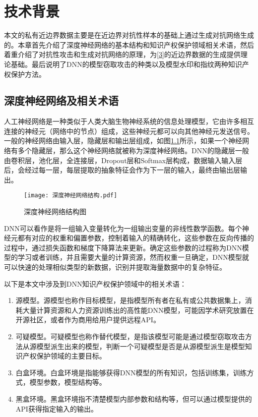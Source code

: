 

\chapter{技术背景} 
\label{2}

本文的私有近边界数据主要是在近边界对抗性样本的基础上通过生成对抗网络生成的。本章首先介绍了深度神经网络的基本结构和知识产权保护领域相关术语，然后着重介绍了对抗性攻击和生成对抗网络的原理，为\ref{3}的近边界数据的生成提供理论基础。最后说明了DNN的模型窃取攻击的种类以及模型水印和指纹两种知识产权保护方法。

\section{深度神经网络及相关术语}

人工神经网络是一种类似于人类大脑生物神经系统的信息处理模型，它由许多相互连接的神经元（网络中的节点）组成，这些神经元都可以向其他神经元发送信号。一般的神经网络由输入层，隐藏层和输出层组成，如图\ref{深度神经网络结构图}所示，如果一个神经网络有多个隐藏层，那么这个神经网络就被称为深度神经网络。DNN的隐藏层一般由卷积层，池化层，全连接层，Dropout层和Softmax层构成，数据输入输入层后，会经过每一层，每层提取的抽象特征会作为下一层的输入，最终由输出层输出。

\begin{figure}[htbp]%
	\centering
	\texttt{[image: 深度神经网络结构.pdf]}
	\setlength{\abovecaptionskip}{5mm} %
	\caption{深度神经网络结构图}
	\label{深度神经网络结构图}
\end {figure}

DNN可以看作是将一组输入变量转化为一组输出变量的非线性数学函数。每个神经元都有对应的权重和偏置参数，控制着输入的精确转化，这些参数在反向传播的过程中，通过损失函数和梯度下降算法来更新。确定这些参数的过程称为DNN模型的学习或者训练，并且需要大量的计算资源，然而权重一旦确定，DNN模型就可以快速的处理相似类型的新数据，识别并提取海量数据中的复杂特征。

以下是本文中涉及到DNN知识产权保护领域中的相关术语：

\begin{enumerate}
	\renewcommand{\labelenumi}{\theenumi)}
	\item 源模型。源模型也称作目标模型，是指模型所有者在私有或公共数据集上，消耗大量计算资源和人力资源训练出的高性能DNN模型，可能因学术研究放置在开源社区，或者作为商用给用户提供远程API。
	\item 可疑模型。可疑模型也称作替代模型，是指该模型可能是通过模型窃取攻击方法从源模型派生出来的模型，判断一个可疑模型是否是从源模型派生是模型知识产权保护领域的主要目标。
	\item 白盒环境。白盒环境是指能够获得DNN模型的所有知识，包括训练集，训练方式，模型参数，模型结构等。
	\item 黑盒环境。黑盒环境指不清楚模型内部参数和结构等，但可以通过模型提供的API获得指定输入的输出。
\end{enumerate}



